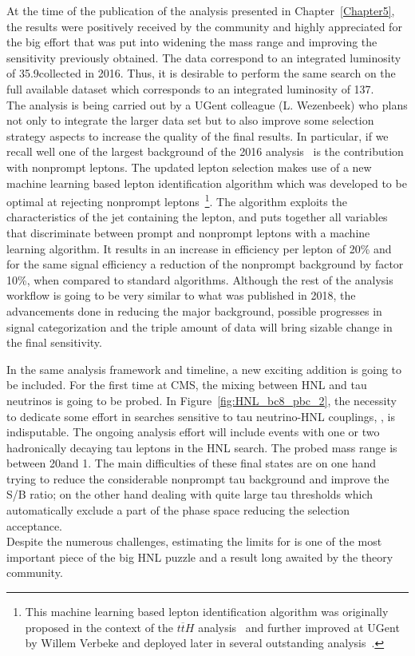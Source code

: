 At the time of the publication of the analysis presented in
Chapter~\ref{Chapter5}, the results were positively received by the community and highly appreciated
for the big effort that was put into widening the mass range and
improving the sensitivity previously obtained. The
data correspond to an integrated luminosity of 
35.9\fbinv collected in 2016. Thus, it is desirable to perform the same
search on the full available dataset which corresponds to an integrated luminosity of 
137\fbinv. \\
The analysis is being carried out by a UGent colleague (L. Wezenbeek)
who plans not only to integrate the larger data set but to also improve
some selection strategy aspects to increase the quality of the final
results. In particular, if we recall well one of the largest
background of the 2016 analysis~\cite{Sirunyan:2018mtv} is the contribution with nonprompt
leptons. The updated lepton selection makes use of a new machine learning
based lepton identification algorithm which was developed to be
optimal at rejecting nonprompt leptons~\footnote{This machine learning
based lepton identification algorithm was originally proposed in the context of the $t\overline{t}H$ analysis~\cite{Sirunyan_2018_ttH} and further improved at UGent by Willem
Verbeke and deployed later in several outstanding analysis~\cite{CMS:2018sgc_tzq, Sirunyan_2021_higgsmumu}.}. The algorithm exploits the
characteristics of the jet containing the lepton, and puts together all
variables that discriminate between prompt and
nonprompt leptons with a machine learning algorithm. It results in an increase in efficiency
per lepton of 20\% and for the same signal
efficiency a reduction of the
nonprompt background
by factor 10\%, when compared to standard algorithms. Although the rest of the analysis workflow is going to be very
similar to what was published in 2018, the advancements done in reducing the
major background, possible progresses in signal categorization and the
triple amount of data will bring sizable change in the final
sensitivity.

In the same analysis framework and timeline, a new exciting addition
is going to be included. For the first time at CMS, the mixing between
HNL and tau neutrinos is going to be probed.
In Figure~\ref{fig:HNL_bc8_pbc_2}, the necessity to dedicate some effort in searches sensitive to tau neutrino-HNL couplings, \mixpart, is indisputable. The ongoing analysis effort will include events with one or two hadronically decaying tau leptons in the HNL search. The probed mass
range is between 20\GeV and 1\TeV. The main difficulties of these final
states are on one hand trying to reduce the considerable nonprompt tau background and
improve the S/B ratio; on the other hand dealing with quite large tau
\pt thresholds which automatically exclude a part of the phase space
reducing the selection acceptance. \\
Despite the numerous challenges, estimating the limits for \mixpart is
one of the most important piece of the big HNL puzzle and a result long awaited
by the theory community.  

